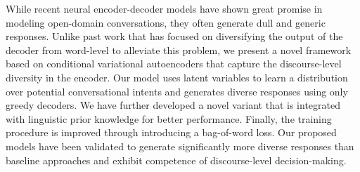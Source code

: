 While recent neural encoder-decoder models have shown great promise in modeling open-domain conversations, they often generate dull and generic responses. Unlike past work that has focused on diversifying the output of the decoder from word-level to alleviate this problem, we present a novel framework based on conditional variational autoencoders that capture the discourse-level diversity in the encoder. Our model uses latent variables to learn a distribution over potential conversational intents and generates diverse responses using only greedy decoders. We have further developed a novel variant that is integrated with linguistic prior knowledge for better performance. Finally, the training procedure is improved through introducing a bag-of-word loss. Our proposed models have been validated to generate significantly more diverse responses than baseline approaches and exhibit competence of discourse-level decision-making.
